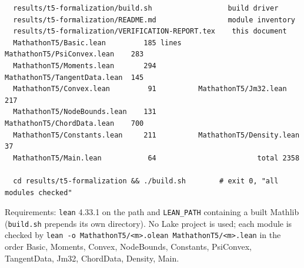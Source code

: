 \documentclass[11pt]{article}
\newcommand{\Ln}[1]{\texttt{#1}}
\begin{document}
\begin{verbatim}
  results/t5-formalization/build.sh                  build driver
  results/t5-formalization/README.md                 module inventory
  results/t5-formalization/VERIFICATION-REPORT.tex    this document
  MathathonT5/Basic.lean         185 lines   MathathonT5/PsiConvex.lean    283
  MathathonT5/Moments.lean       294          MathathonT5/TangentData.lean  145
  MathathonT5/Convex.lean         91          MathathonT5/Jm32.lean         217
  MathathonT5/NodeBounds.lean    131          MathathonT5/ChordData.lean    700
  MathathonT5/Constants.lean     211          MathathonT5/Density.lean       37
  MathathonT5/Main.lean           64                        total 2358

  cd results/t5-formalization && ./build.sh        # exit 0, "all modules checked"
\end{verbatim}

\noindent Requirements: \Ln{lean} 4.33.1 on the path and \Ln{LEAN\_\allowbreak{}PATH} containing a built
Mathlib (\Ln{build.sh} prepends its own directory). No Lake project is used; each module is
checked by \Ln{lean -o MathathonT5/<m>.olean MathathonT5/<m>.lean} in the order
Basic, Moments, Convex, NodeBounds, Constants, PsiConvex, TangentData, Jm32, ChordData,
Density, Main.
\end{document}

